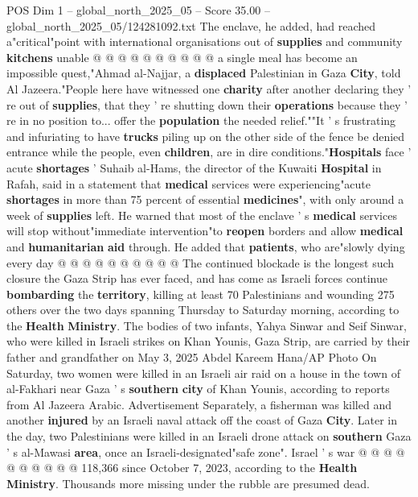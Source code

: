 \begin{textsample}{POS Dim 1 – global\_north\_2025\_05 – Score 35.00 – global\_north\_2025\_05/124281092.txt}
The enclave, he added, had reached a"critical"point with international organisations out of \textbf{supplies} and community \textbf{kitchens} unable @ @ @ @ @ @ @ @ @ @ a single meal has become an impossible quest,"Ahmad al-Najjar, a \textbf{displaced} Palestinian in Gaza \textbf{City}, told Al Jazeera."People here have witnessed one \textbf{charity} after another declaring they ' re out of \textbf{supplies}, that they ' re shutting down their \textbf{operations} because they ' re in no position to... offer the \textbf{population} the needed relief.""It ' s frustrating and infuriating to have \textbf{trucks} piling up on the other side of the fence be denied entrance while the people, even \textbf{children}, are in dire conditions."\textbf{Hospitals} face ' acute \textbf{shortages} ' Suhaib al-Hams, the director of the Kuwaiti \textbf{Hospital} in Rafah, said in a statement that \textbf{medical} services were experiencing"acute \textbf{shortages} in more than 75 percent of essential \textbf{medicines}", with only around a week of \textbf{supplies} left.
He warned that most of the enclave ' s \textbf{medical} services will stop without"immediate intervention"to \textbf{reopen} borders and allow \textbf{medical} and \textbf{humanitarian} \textbf{aid} through.
He added that \textbf{patients}, who are"slowly dying every day @ @ @ @ @ @ @ @ @ @ The continued blockade is the longest such closure the Gaza Strip has ever faced, and has come as Israeli forces continue \textbf{bombarding} the \textbf{territory}, killing at least 70 Palestinians and wounding 275 others over the two days spanning Thursday to Saturday morning, according to the \textbf{Health} \textbf{Ministry}.
The bodies of two infants, Yahya Sinwar and Seif Sinwar, who were killed in Israeli strikes on Khan Younis, Gaza Strip, are carried by their father and grandfather on May 3, 2025 Abdel Kareem Hana/AP Photo On Saturday, two women were killed in an Israeli air raid on a house in the town of al-Fakhari near Gaza ' s \textbf{southern} \textbf{city} of Khan Younis, according to reports from Al Jazeera Arabic.
Advertisement Separately, a fisherman was killed and another \textbf{injured} by an Israeli naval attack off the coast of Gaza \textbf{City}.
Later in the day, two Palestinians were killed in an Israeli drone attack on \textbf{southern} Gaza ' s al-Mawasi \textbf{area}, once an Israeli-designated"safe zone".
Israel ' s war @ @ @ @ @ @ @ @ @ @ 118,366 since October 7, 2023, according to the \textbf{Health} \textbf{Ministry}.
Thousands more missing under the rubble are presumed dead.

\end{textsample}
